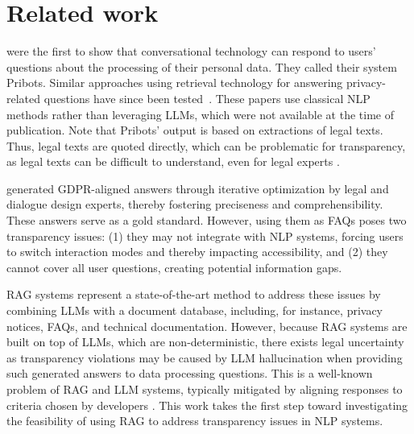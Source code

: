 \section{Related work}
\citet{Harkous2016PriBotsCP} were the first to show that conversational technology can respond to users' questions about the processing of their personal data. They called their system Pribots. Similar approaches using retrieval technology for answering privacy-related questions have since been tested~\cite{mysore-sathyendra-etal-2017-identifying, ravichander-etal-2019-question, ahmad-etal-2020-policyqa}. These papers use classical NLP methods rather than leveraging LLMs, which were not available at the time of publication. Note that Pribots' output is based on extractions of legal texts. Thus, legal texts are quoted directly, which can be problematic for transparency, as legal texts can be difficult to understand, even for legal experts \cite{martinez2023, Article29WP2018}.


\citet{expert_privacy_qa} generated GDPR-aligned answers through iterative optimization by legal and dialogue design experts, thereby fostering preciseness and comprehensibility. These answers serve as a gold standard. However, using them as FAQs poses two transparency issues: (1) they may not integrate with NLP systems, forcing users to switch interaction modes and thereby impacting accessibility, and (2) they cannot cover all user questions, creating potential information gaps.

RAG systems represent a state-of-the-art method to address these issues by combining LLMs with a document database, including, for instance, privacy notices, FAQs, and technical documentation. However, because RAG systems are built on top of LLMs, which are non-deterministic, there exists legal uncertainty as transparency violations may be caused by LLM hallucination when providing such generated answers to data processing questions. This is a well-known problem of RAG and LLM systems, typically mitigated by aligning responses to criteria chosen by developers \cite{Askell2021AGL, pmlr-v235-huang24x}. This work takes the first step toward investigating the feasibility of using RAG to address transparency issues in NLP systems.